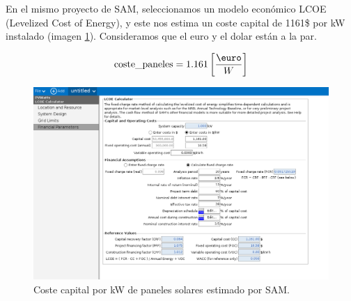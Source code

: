 En el mismo proyecto de SAM, seleccionamos un modelo económico LCOE (Levelized
Cost of Energy), y este nos estima un coste capital de 1161\$ por kW instalado
(imagen \ref{fig:sam_solar_cost}). Consideramos que el euro y el dolar están a
la par.

\begin{equation*}
	\text{coste\_paneles} = 1.161 \left[\frac{\text{\euro}}{W}\right]
\end{equation*}

\begin{figure}[h] \centering
	\centering
	\includegraphics[width=1\textwidth]{./capitulos/adquisicion_de_datos/images/sam_solar_cost.png}
	\caption{Coste capital por kW de paneles solares estimado por SAM.}
	\label{fig:sam_solar_cost}
\end{figure}
